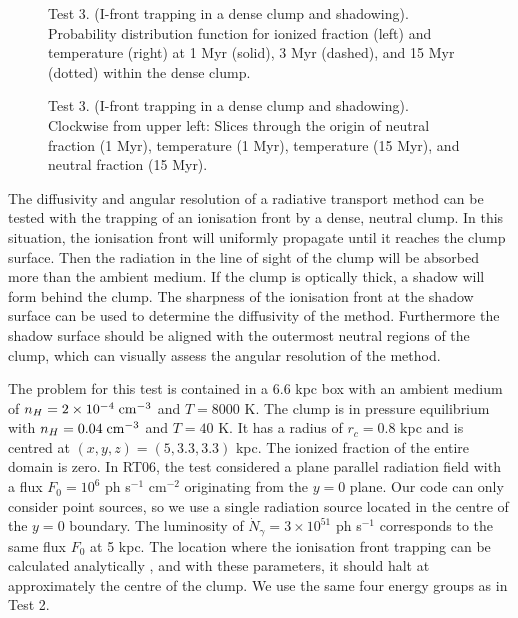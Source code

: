 \documentclass[useAMS,usenatbib]{mn2e}
\begin{document}
\begin{figure}
  \caption{\label{fig:test3_pdf} Test 3. (I-front trapping in a dense
    clump and shadowing). Probability distribution function for
    ionized fraction (left) and temperature (right) at 1 Myr (solid),
    3 Myr (dashed), and 15 Myr (dotted) within the dense clump.}
\end{figure}

\begin{figure*}
  \caption{\label{fig:test3_3} Test 3. (I-front trapping in a dense
    clump and shadowing).  Clockwise from upper left: Slices through
    the origin of neutral fraction (1 Myr), temperature (1 Myr),
    temperature (15 Myr), and neutral fraction (15 Myr).}
\end{figure*}

The diffusivity and angular resolution of a radiative transport method
can be tested with the trapping of an ionisation front by a dense,
neutral clump.  In this situation, the ionisation front will uniformly
propagate until it reaches the clump surface.  Then the radiation in
the line of sight of the clump will be absorbed more than the ambient
medium.  If the clump is optically thick, a shadow will form behind
the clump.  The sharpness of the ionisation front at the shadow
surface can be used to determine the diffusivity of the method.
Furthermore the shadow surface should be aligned with the outermost
neutral regions of the clump, which can visually assess the angular
resolution of the method.

The problem for this test is contained in a 6.6 kpc box with an
ambient medium of $n_H = 2 \times 10^{-4}\;\cubecm$ and $T = 8000$ K.
The clump is in pressure equilibrium with $n_H = 0.04\; \cubecm$ and
$T = 40$ K.  It has a radius of $r_c = 0.8$ kpc and is centred at
$(x,y,z) = (5, 3.3, 3.3)$ kpc.  The ionized fraction of the entire
domain is zero.  In RT06, the test considered a plane parallel
radiation field with a flux $F_0 = 10^6$ ph s$^{-1}$ cm$^{-2}$
originating from the $y=0$ plane.  Our code can only consider point
sources, so we use a single radiation source located in the centre of
the $y=0$ boundary.  The luminosity of $\dot{N}_\gamma = 3 \times
10^{51}$ ph s$^{-1}$ corresponds to the same flux $F_0$ at 5 kpc.  The
location where the ionisation front trapping can be calculated
analytically \citep{Shapiro04}, and with these parameters, it should
halt at approximately the centre of the clump.  We use the same four
energy groups as in Test 2.
\end{document}

